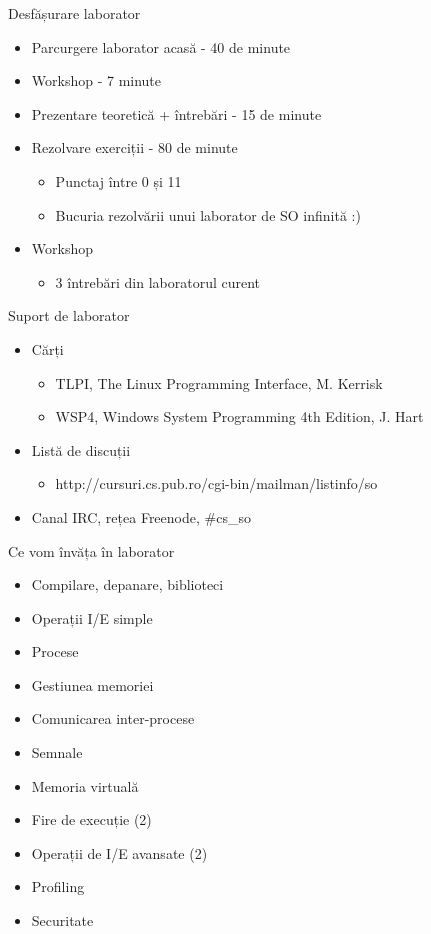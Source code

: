 \documentclass{so.cs.pub.ro}
\begin{document}
\begin{frame}{Desfășurare laborator}
	\begin{itemize}
		\item Parcurgere laborator acasă -  40 de minute
		\item Workshop - 7 minute
		\item Prezentare teoretică + întrebări - 15 de minute
		\item Rezolvare exerciții - 80 de minute
		\begin{itemize}
	    		\item Punctaj între 0 și 11
	   		 \item Bucuria rezolvării unui laborator de SO infinită :)
		\end{itemize}
		\item Workshop
		\begin{itemize}
	    		\item 3 întrebări din laboratorul curent
		\end{itemize}
	\end{itemize}
\end{frame}

\begin{frame}{Suport de laborator}
	\begin{itemize}
	\item Cărți
	\begin{itemize}
		\item TLPI, The Linux Programming Interface, M. Kerrisk
		\item WSP4, Windows System Programming 4th Edition, J. Hart
	\end{itemize}
	\item Listă de discuții
	\begin{itemize}
		\item http://cursuri.cs.pub.ro/cgi-bin/mailman/listinfo/so
	\end{itemize}
	\item Canal IRC, rețea Freenode, \#cs\_so
	\end{itemize}
\end{frame}

\begin{frame}{Ce vom învăța în laborator}
	\begin{itemize}
		\item Compilare, depanare, biblioteci
		\item Operații I/E simple
		\item Procese
		\item Gestiunea memoriei
		\item Comunicarea inter-procese
		\item Semnale 
		\item Memoria virtuală
		\item Fire de execuție (2) 
		\item Operații de I/E avansate (2)
		\item Profiling 
		\item Securitate
	\end{itemize}
\end{frame}
\end{document}
